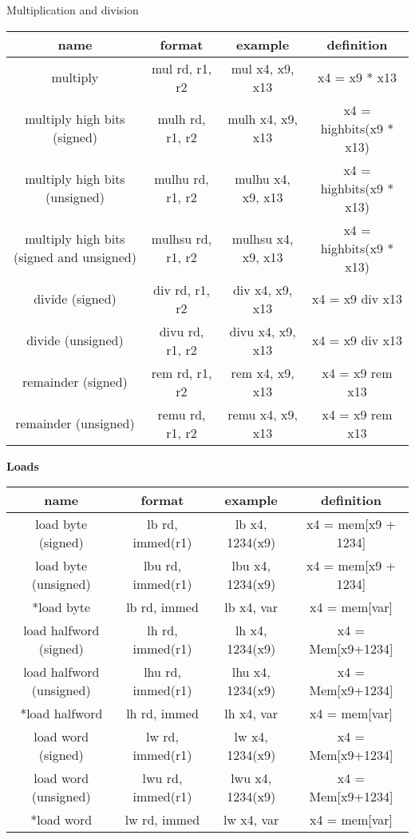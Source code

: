 \documentclass{article}
\begin{document}
\begin{center}
  Multiplication and division

  \begin{tabular}{|c|c|c|c|}
    \hline
    name          & format             & example          & definition    \\
    \hline
    multiply & mul rd, r1, r2 & mul x4, x9, x13 & x4 = x9 * x13 \\
    multiply high bits (signed) & mulh rd, r1, r2 & mulh x4, x9, x13 & x4 = highbits(x9 * x13) \\
    multiply high bits (unsigned) & mulhu rd, r1, r2 & mulhu x4, x9, x13 & x4 = highbits(x9 * x13) \\
    multiply high bits (signed and unsigned) & mulhsu rd, r1, r2 & mulhsu x4, x9, x13 & x4 = highbits(x9 * x13) \\
    divide (signed) & div rd, r1, r2 & div x4, x9, x13 & x4 = x9 div x13 \\
    divide (unsigned) & divu rd, r1, r2 & divu x4, x9, x13 & x4 = x9 div x13 \\
    remainder (signed) & rem rd, r1, r2 & rem x4, x9, x13 & x4 = x9 rem x13 \\
    remainder (unsigned) & remu rd, r1, r2 & remu x4, x9, x13 & x4 = x9 rem x13 \\
    \hline
  \end{tabular}

  \textbf{Loads}

  \begin{tabular}{|c|c|c|c|}
    \hline
    name            & format            & example          & definition \\
    \hline
    load byte (signed) & lb rd, immed(r1) & lb x4, 1234(x9) & x4 = mem[x9 + 1234] \\
    load byte (unsigned) & lbu rd, immed(r1) & lbu x4, 1234(x9) & x4 = mem[x9 +
    1234] \\
    *load byte & lb rd, immed & lb x4, var & x4 = mem[var] \\
    load halfword (signed) & lh rd, immed(r1) & lh x4, 1234(x9) & x4 = Mem[x9+1234] \\
    load halfword (unsigned) & lhu rd, immed(r1) & lhu x4, 1234(x9) & x4 =
    Mem[x9+1234] \\
    *load halfword & lh rd, immed & lh x4, var & x4 = mem[var] \\
    load word (signed)  & lw rd, immed(r1) & lw x4, 1234(x9) & x4 = Mem[x9+1234] \\
    load word (unsigned)  & lwu rd, immed(r1) & lwu x4, 1234(x9) & x4 =
    Mem[x9+1234] \\
    *load word & lw rd, immed & lw x4, var & x4 = mem[var] \\
    \hline
  \end{tabular}


\end{center}
\end{document}
